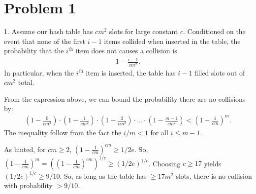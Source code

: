 \documentclass[11pt]{article}
\begin{document}
	
\section*{Problem 1 }
	1. \hspace{1em} Assume our hash table has $cm^2$ slots for  large constant $c$. Conditioned on the event that none of the first $i-1$ items collided when inserted in the table, the probability that the $i^\text{th}$ item does not causes a collision is
	\begin{align*}
		1 - \frac{i-1}{cm^2}.
	\end{align*}
In particular, when the $i^\text{th}$ item is inserted, the table has $i-1$ filled slots out of $cm^2$ total. 

From the expression above, we can bound the probability there are no collisions by:
	\begin{align*}
	\left(1 - \frac{0}{cm^2}\right)\cdot \left(1 - \frac{1}{cm^2}\right)\cdot \left(1 - \frac{2}{cm^2}\right) \cdot \ldots \cdot \left(1 - \frac{m-1}{cm^2}\right) < \left(1 - \frac{1}{cm}\right)^m.
	\end{align*}
	The inequality follow from the fact the $i/m < 1$ for all $i \leq m-1$. 

	As hinted, for $cm \geq 2$, $(1 - \frac{1}{cm})^{cm} \geq 1/2e$. So, $(1 - \frac{1}{cm})^m = \left((1 - \frac{1}{cm})^{cm}\right)^{1/c} \geq (1/2e)^{1/c}$.  Choosing $c \geq 17$ yields $(1/2e)^{1/c} \geq 9/10$. So, as long as the table has $\geq 17m^2$ slots, there is no collision with probability $> 9/10$. 
	
\end{document}
